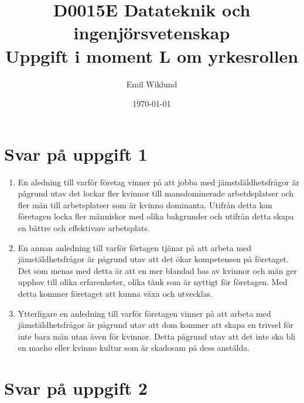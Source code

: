 \documentclass[a4paper,12pt]{article}
\title{D0015E Datateknik och ingenjörsvetenskap \\
       Uppgift i moment L om yrkesrollen}
\author{Emil Wiklund}
\date{\today}
\begin{document}
\maketitle




\section*{Svar på uppgift 1}



\begin{enumerate}
  \item En aledning till varför företag vinner på att jobba med 
  jämstdäldhetsfrågor är pågrund utav det lockar fler kvinnor 
  till mansdominerade arbetdsplatser och fler män till arbetsplatser
  som är kvinno dominanta. Utifrån detta kan företagen locka fler
  människor med olika bakgrunder och utifrån detta skapa en bättre
  och effektivare arbetsplats. 
 \item En annan anledning till varför förtagen tjänar på att 
  arbeta med jämstäldhetsfrågor är pågrund utav att det ökar
  kompetensen på företaget. Det som menas med detta är att en mer 
  blandad bas av kvinnor och män ger upphov till olika erfarenheter, 
  olika tänk som är nyttigt för företagen. Med detta kommer företaget
  att kunna växa och utvecklas. 
  \item Ytterligare en anledning till varför företagen vinner på att arbeta med
  jämstäldhetsfrågor är pågrund utav att dom kommer att skapa en trivsel 
  för inte bara män utan även för kvinnor. Detta pågrund utav att det inte 
  ska bli en macho eller kvinno kultur som är skadosam på dess anstälda. 
\end{enumerate}


\section*{Svar på uppgift 2}


\end{document}
